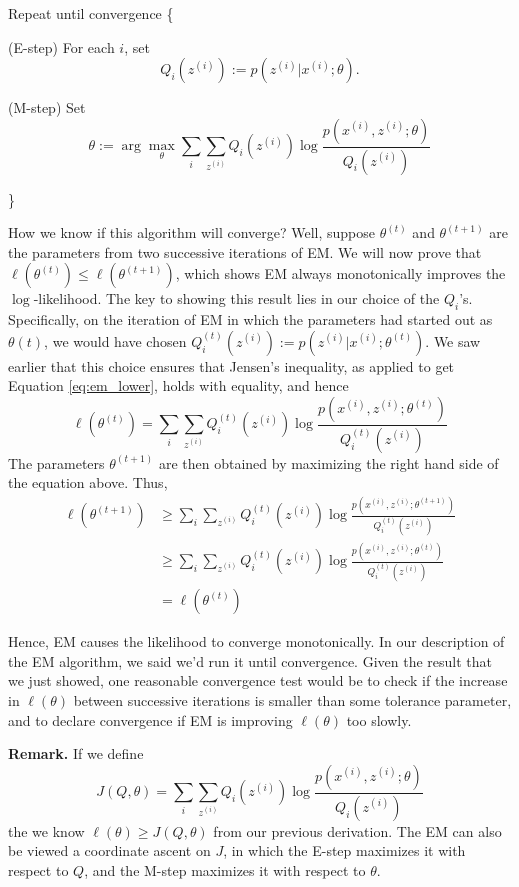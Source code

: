     \qquad Repeat until convergence \{

        \qquad\qquad (E-step) For each $i$, set
                \[
                    Q_i(z^{(i)}) := p(z^{(i)}|x^{(i)}; \theta).
                \]

        \qquad\qquad (M-step) Set
                \[
                    \theta := \arg\max \limits_{\theta} \sum\limits_{i} \sum\limits_{z^{(i)}}
                                Q_i(z^{(i)})\log\frac{p(x^{(i)}, z^{(i)}; \theta)}{Q_i(z^{(i)})}
                \]

    \qquad \}

    How we know if this algorithm will converge? Well, suppose $\theta^{(t)}$ and $\theta^{(t+1)}$ are the
parameters from two successive iterations of EM. We will now prove that
$\ell(\theta^{(t)}) \le \ell(\theta^{(t+1)})$, which shows EM always monotonically improves the $\log$-likelihood.
The key to showing this result lies in our choice of the $Q_i$'s.
Specifically, on the iteration of EM in which the parameters had started out as $\theta(t)$,
we would have chosen $Q_i^{(t)}(z^{(i)}) := p(z^{(i)}|x^{(i)};\theta^{(t)})$. We saw earlier that this choice
ensures that Jensen's inequality, as applied to get Equation \ref{eq:em_lower}, holds with equality, and hence 
\[
    \ell(\theta^{(t)}) = \sum\limits_{i} \sum\limits_{z^{(i)}}
            Q_i^{(t)}(z^{(i)}) \log\frac{p(x^{(i)},z^{(i)};\theta^{(t)})}{Q_i^{(t)}(z^{(i)})}
\]
The parameters $\theta^{(t+1)}$ are then obtained by maximizing the right hand side of the equation above.
Thus,
\begin{align*}
    \ell(\theta^{(t+1)}) & \ge \sum\limits_{i} \sum\limits_{z^{(i)}}
                            Q_i^{(t)}(z^{(i)}) \log\frac{p(x^{(i)},z^{(i)};\theta^{(t+1)})}{Q_i^{(t)}(z^{(i)})} \\
                         & \ge \sum\limits_{i} \sum\limits_{z^{(i)}}
                            Q_i^{(t)}(z^{(i)}) \log\frac{p(x^{(i)},z^{(i)};\theta^{(t)})}{Q_i^{(t)}(z^{(i)})} \\
                         &= \ell(\theta^{(t)})
\end{align*}

    Hence, EM causes the likelihood to converge monotonically. In our description of the EM algorithm,
we said we'd run it until convergence. Given the result that we just showed, one reasonable convergence
test would be to check if the increase in $\ell(\theta)$ between successive iterations is smaller than
some tolerance parameter, and to declare convergence if EM is improving $\ell(\theta)$ too slowly.

\textbf{Remark.} If we define
\[
    J(Q, \theta) = \sum\limits_{i} \sum\limits_{z^{(i)}}
                            Q_i(z^{(i)}) \log\frac{p(x^{(i)}, z^{(i)}; \theta)}{Q_i(z^{(i)})}
\]
the we know $\ell(\theta) \ge J(Q,\theta)$ from our previous derivation.
The EM can also be viewed a coordinate ascent on $J$, in which the E-step maximizes it with respect to $Q$,
and the M-step maximizes it with respect to $\theta$.

\ifx\mlbook\undefined
    
\fi
